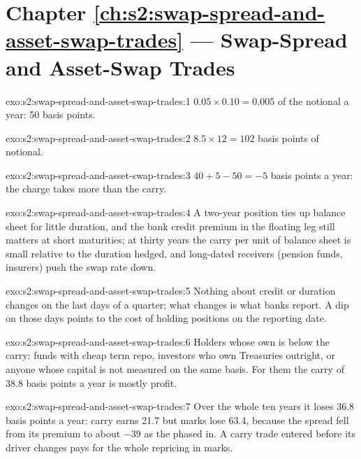 \section*{Chapter \ref{ch:s2:swap-spread-and-asset-swap-trades} --- Swap-Spread and Asset-Swap Trades}

\begin{solution}{exo:s2:swap-spread-and-asset-swap-trades:1}
$0.05 \times 0.10 = 0.005$ of the notional a year: 50 basis points.
\end{solution}

\begin{solution}{exo:s2:swap-spread-and-asset-swap-trades:2}
$8.5 \times 12 = 102$ basis points of notional.
\end{solution}

\begin{solution}{exo:s2:swap-spread-and-asset-swap-trades:3}
$40 + 5 - 50 = -5$ basis points a year: the charge takes more than the carry.
\end{solution}

\begin{solution}{exo:s2:swap-spread-and-asset-swap-trades:4}
A two-year position ties up balance sheet for little duration, and the bank credit premium in the floating leg still matters at short maturities;
at thirty years the carry per unit of balance sheet is small relative to the duration hedged, and long-dated receivers (pension funds, insurers)
push the swap rate down.
\end{solution}

\begin{solution}{exo:s2:swap-spread-and-asset-swap-trades:5}
Nothing about credit or duration changes on the last days of a quarter; what changes is what banks report. A dip on those days points to the cost of
holding positions on the reporting date.
\end{solution}

\begin{solution}{exo:s2:swap-spread-and-asset-swap-trades:6}
Holders whose own  is below the carry: funds with cheap term repo, investors who own Treasuries outright, or anyone whose capital is
not measured on the same basis. For them the carry of 38.8 basis points a year is mostly profit.
\end{solution}

\begin{solution}{exo:s2:swap-spread-and-asset-swap-trades:7}
Over the whole ten years it loses 36.8 basis points a year: carry earns 21.7 but marks lose 63.4, because the spread fell from its premium to about
$-39$ as the  phased in. A carry trade entered before its driver changes pays for the whole repricing in marks.
\end{solution}

